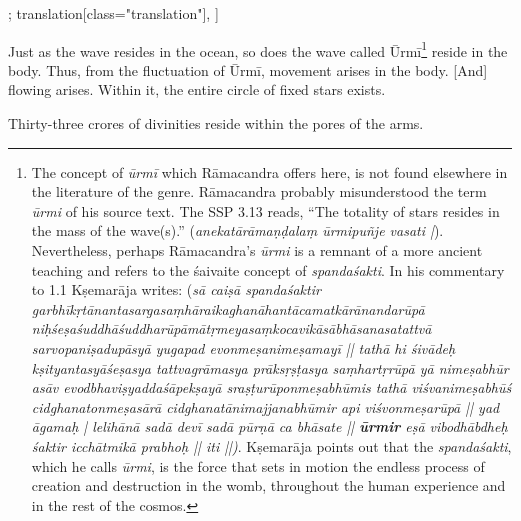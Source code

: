 \begin{alignment}[
  texts=edition[class="edition"];
  translation[class="translation"],
  ]
\begin{translation}
\begin{tlate}[p41_01]
Just as the wave resides in the ocean, so does the wave called Ūrmī\footnote{The concept of \textit{ūrmī} which Rāmacandra offers here, is not found elsewhere in the literature of the genre. Rāmacandra probably misunderstood the term \textit{ūrmi} of his source text. The SSP 3.13 reads, ``The totality of stars resides in the mass of the wave(s).'' (\textit{anekatārāmaṇḍalaṃ ūrmipuñje vasati |}). Nevertheless, perhaps Rāmacandra's \textit{ūrmi} is a remnant of a more ancient teaching and refers to the śaivaite concept of \textit{spandaśakti}. In his commentary to  1.1 Kṣemarāja writes: (\textit{sā caiṣā spandaśaktir garbhīkṛtānantasargasaṃhāraikaghanāhantācamatkārānandarūpā niḥśeṣaśuddhāśuddharūpāmātṛmeyasaṃkocavikāsābhāsanasatattvā sarvopaniṣadupāsyā yugapad evonmeṣanimeṣamayī || tathā hi śivādeḥ kṣityantasyāśeṣasya tattvagrāmasya prāksṛṣṭasya saṃhartṛrūpā yā nimeṣabhūr asāv evodbhaviṣyaddaśāpekṣayā sraṣṭurūponmeṣabhūmis tathā viśvanimeṣabhūś cidghanatonmeṣasārā cidghanatānimajjanabhūmir api viśvonmeṣarūpā || yad āgamaḥ | lelihānā sadā devī sadā pūrṇā ca bhāsate || \textbf{ūrmir} eṣā vibodhābdheḥ śaktir icchātmikā prabhoḥ || iti ||)}. Kṣemarāja points out that the \textit{spandaśakti}, which he calls \textit{ūrmi}, is the force that sets in motion the endless process of creation and destruction in the womb, throughout the human experience and in the rest of the cosmos.} reside in the body. Thus, from the fluctuation of Ūrmī, movement arises in the body. [And] flowing arises. Within it, the entire circle of fixed stars exists.

Thirty-three crores of divinities reside within the pores of the arms.
\flushpage
\end{tlate}
  \end{translation}
\end{alignment}
\pagebreak %
